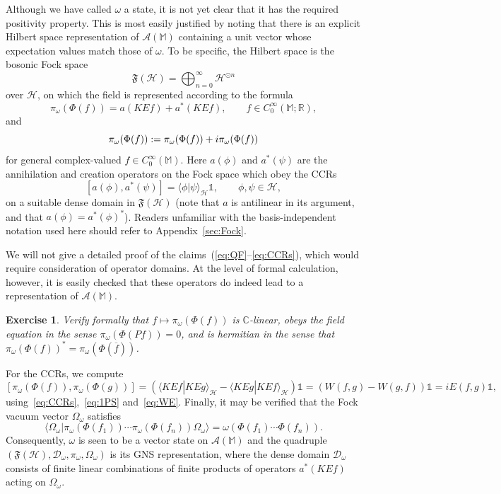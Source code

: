 \documentclass[12pt,a4paper]{article}
\let\Re\relax
\let\Im\relax
\DeclareMathOperator{\Re}{Re}
\DeclareMathOperator{\Im}{Im}
\newcommand{\1}{\mathds{1}}                         %
\newcommand{\RR}{\mathbb{R}}           %
\newcommand{\CC}{\mathbb{C}}           %
\newcommand{\MM}{\mathbb{M}}
\newcommand{\FF}{{\mathfrak{F}}}
\newcommand{\HH}{{\mathcal{H}}}
\newcommand{\DD}{{\mathscr{D}}}
\newcommand{\II}{{\mathbb{1}}}
\newcommand{\Ac}{{\mathcal{A}}}
\newcommand{\CoinX}[1]{C_0^\infty(#1)}
\newcommand{\ip}[2]{\langle #1|#2\rangle}
\newtheorem{exercise}[theorem]{Exercise}
\begin{document}
Although we have called $\omega$ a state, it is not yet clear that it has the required positivity property. This is most easily justified by noting that there is an explicit Hilbert space representation of $\Ac(\MM)$ containing a unit vector whose expectation values match those of $\omega$. To be specific, the Hilbert space is
the bosonic Fock space 
\begin{equation}\label{eq:qfF}
\FF(\HH) = \bigoplus_{n=0}^\infty \HH^{\odot n}
\end{equation}
over $\HH$, on which the field is represented according to the formula
\begin{equation}\label{eq:qfpi}
\pi_\omega(\Phi(f)) = a(KE f) + a^*(KEf)  ,\qquad f\in\CoinX{\MM;\RR},
\end{equation}
and
\[
\pi_\omega(\Phi(f)):=\pi_\omega(\Phi(\Re f)) + i\pi_\omega(\Phi(\Im f))
\]
for general complex-valued $f\in\CoinX{\MM}$.
Here $a(\phi)$ and $a^*(\psi)$ are the annihilation and creation operators on the Fock space which obey the CCRs
\begin{equation}\label{eq:CCRs}
[a(\phi),a^*(\psi)] = \ip{\phi}{\psi}_\HH\II, \qquad \phi,\psi\in\HH,
\end{equation}
on a suitable dense domain in $\FF(\HH)$ 
(note that $a$ is antilinear in its argument, and that $a(\phi)=a^*(\phi)^*$). Readers unfamiliar with the basis-independent notation used here should refer to Appendix~\ref{sec:Fock}. 

We will not give a detailed proof of the claims~(\ref{eq:QF}--\ref{eq:CCRs}), which would require consideration of operator domains.
At the level of formal calculation, however, it is easily checked that these operators do indeed lead to a representation of $\Ac(\MM)$.
\begin{exercise} Verify formally that $f\mapsto \pi_\omega(\Phi(f))$ is $\CC$-linear, obeys the field equation in the sense $\pi_\omega(\Phi(Pf))=0$, and is hermitian in the sense that $\pi_\omega(\Phi(f))^*=\pi_\omega(\Phi(\overline{f}))$.
\end{exercise}
For the CCRs, we compute
\[
[\pi_\omega(\Phi(f)),\pi_\omega(\Phi(g))] = \left(\ip{KEf}{KEg}_\HH - \ip{KEg}{KEf}_\HH\right)\II = 
\left(W(f,g)-W(g,f)\right)\II = iE(f,g)\II,
\]
using~\eqref{eq:CCRs},~\eqref{eq:1PS} and~\eqref{eq:WE}. Finally, 
it may be verified that the Fock vacuum vector $\Omega_\omega$ satisfies
\[
\ip{\Omega_\omega}{\pi_\omega(\Phi(f_1))\cdots \pi_\omega(\Phi(f_n))\Omega_\omega} = \omega(\Phi(f_1)\cdots \Phi(f_n)).
\]
Consequently, $\omega$ is seen to be a vector state on $\Ac(\MM)$ 
and the quadruple $(\FF(\HH), \DD_\omega,\pi_\omega,\Omega_\omega)$ is its GNS representation, where
the dense domain $\DD_\omega$ consists of finite linear combinations of finite products of operators $a^*(KEf)$ acting on $\Omega_\omega$.
\end{document}

